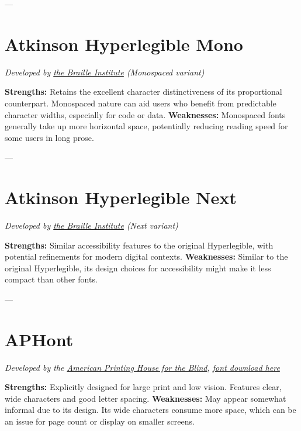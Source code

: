 ---
\pagebreak
\section{Atkinson Hyperlegible Mono}\label{troubleAtkinsonMono}
\emph{Developed by \href{https://brailleinstitute.org/freefont}{the Braille Institute} (Monospaced variant)}
\begin{raggedright}
\textbf{Strengths:} Retains the excellent character distinctiveness of its proportional counterpart. Monospaced nature can aid users who benefit from predictable character widths, especially for code or data.
\textbf{Weaknesses:} Monospaced fonts generally take up more horizontal space, potentially reducing reading speed for some users in long prose.

\FontSample{\atkinsonmonofont}
\end{raggedright}

---
\pagebreak
\section{Atkinson Hyperlegible Next}\label{troubleAtkinsonNext}
\emph{Developed by \href{https://brailleinstitute.org/freefont}{the Braille Institute} (Next variant)}
\begin{raggedright}
\textbf{Strengths:} Similar accessibility features to the original Hyperlegible, with potential refinements for modern digital contexts.
\textbf{Weaknesses:} Similar to the original Hyperlegible, its design choices for accessibility might make it less compact than other fonts.

\FontSample{\atkinsonnextfont}
\end{raggedright}

---
\pagebreak
\section{APHont}\label{trouble7}
\emph{Developed by the \href{https://www.aph.org/resources/large-print-guidelines/}{American Printing House for the Blind}, \href{https://www.aph.org/resources/large-print-guidelines/}{font download here}}
\begin{raggedright}
\textbf{Strengths:} Explicitly designed for large print and low vision. Features clear, wide characters and good letter spacing.
\textbf{Weaknesses:} May appear somewhat informal due to its design. Its wide characters consume more space, which can be an issue for page count or display on smaller screens.

\FontSample{\aphontfont}
\end{raggedright}

